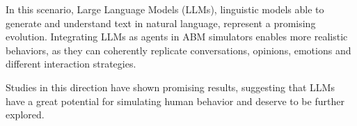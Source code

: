 In this scenario, Large Language Models (LLMs), linguistic models able to generate and understand text in natural language, represent a promising evolution.
Integrating LLMs as agents in ABM simulators enables more realistic behaviors, as they can coherently replicate conversations, opinions, emotions and different interaction strategies.

Studies in this direction have shown promising results, suggesting that LLMs have a great potential for simulating human behavior and deserve to be further explored.


